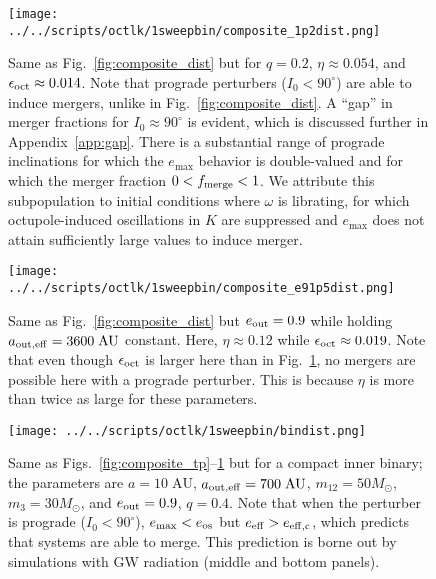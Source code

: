 \documentclass[
        fleqn,
        usenatbib,
    ]{mnras}
\newlength{\colummwidth}
\begin{document}
\begin{figure}
    \centering
    \texttt{[image: ../../scripts/octlk/1sweepbin/composite\_1p2dist.png]}
    \caption{Same as Fig.~\ref{fig:composite_dist} but for $q = 0.2$, $\eta
    \approx 0.054$, and $\epsilon_{\rm oct} \approx 0.014$. Note that prograde
    perturbers ($I_0 < 90^\circ$) are able to induce mergers, unlike in
    Fig.~\ref{fig:composite_dist}. A ``gap'' in merger fractions for $I_0
    \approx 90^\circ$ is evident, which is discussed further in
    Appendix~\ref{app:gap}. There is a substantial range of prograde
    inclinations for which the $e_{\max}$ behavior is double-valued and for
    which the merger fraction $0 < f_{\rm merge} < 1$. We attribute this
    subpopulation to initial conditions where $\omega$ is librating, for which
    octupole-induced oscillations in $K$ are suppressed \citep{katz2011long} and
    $e_{\max}$ does not attain sufficiently large values to induce merger.
    }\label{fig:composite_1p2}
\end{figure}
\begin{figure}
    \centering
    \texttt{[image: ../../scripts/octlk/1sweepbin/composite\_e91p5dist.png]}
    \caption{Same as Fig.~\ref{fig:composite_dist} but $e_{\rm out} = 0.9$
    while holding $a_{\rm out, eff} = 3600\;\mathrm{AU}$ constant. Here, $\eta
    \approx 0.12$ while $\epsilon_{\rm oct} \approx 0.019$. Note that even
    though $\epsilon_{\rm oct}$ is larger here than in
    Fig.~\ref{fig:composite_1p2}, no mergers are possible here with a prograde
    perturber. This is because $\eta$ is more than twice as large for these
    parameters.
    }\label{fig:composite_e91p5}
\end{figure}
\begin{figure}
    \centering
    \texttt{[image: ../../scripts/octlk/1sweepbin/bindist.png]}
    \caption{Same as Figs.~\ref{fig:composite_tp}--\ref{fig:composite_1p2}
    but for a compact inner binary; the parameters are $a = 10\;\mathrm{AU}$,
    $a_{\rm out, eff} = 700\;\mathrm{AU}$, $m_{12} = 50M_{\odot}$, $m_3 =
    30M_{\odot}$, and $e_{\rm out} = 0.9$, $q = 0.4$. Note that when the
    perturber is prograde ($I_0 < 90^\circ$), $e_{\max} <
    e_{\rm os}$ but $e_{\rm eff} > e_{\rm eff, c}$, which predicts that systems
    are able to merge. This prediction is borne out by simulations with GW
    radiation (middle and bottom panels). }\label{fig:composite_bindist}
\end{figure}
\end{document}
